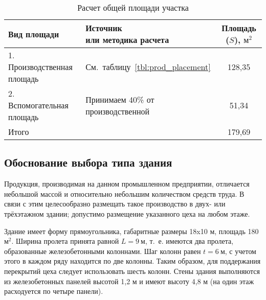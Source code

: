 \begin{table} [h!]
  \caption{
    Расчет общей площади участка
  }\label{tbl:common_placement}
    \begin{tabular}{| m{5.8cm} | m{5.75cm} | c |}
      \hline
      \parbox{5.8cm}{
        \smallskip
        \centering Вид  площади
        \smallskip
      }
      & \parbox{5.75cm}{
          \smallskip
          \centering Источник \\ или методика расчета
          \smallskip
      }
      & Площадь (\( S \)), \( \text{м}^2 \) \\
      \hline

      1. Производственная \newline площадь 
      & \centering См.~таблицу~\ref{tbl:prod_placement}
      & 128{,}35 \\
      \hline

      2. Вспомогательная \newline площадь 
      & \centering Принимаем 40\% \newline от производственной
      & 51{,}34 \\
      \hline
      
      Итого & & 179{,}69 \\
      \hline
    \end{tabular}
\end{table}

\subsection{Обоснование выбора типа здания}

Продукция, производимая на данном промышленном предприятии,
отличается небольшой массой и относительно небольшим количеством средств труда.
В связи с этим целесообразно размещать такое производство в двух- или трёхэтажном
здании; допустимо размещение указанного цеха на любом этаже.

Здание имеет форму прямоугольника, габаритные размеры 18x10 м, 
площадь 180 \( \text{м}^2 \).
Ширина пролета принята равной \( L = 9 \: \text{м} \),
т.~е. имеются два пролета, образованные железобетонными колоннами. 
Шаг колонн равен \( t = 6 \: \text{м} \), с учетом этого в каждом ряду находится
по две колонны.
Таким образом, для поддержания перекрытий цеха следует использовать шесть колонн.
Стены здания выполняются из железобетонных панелей высотой 1,2 м и
имеют высоту 4,8 м (на один этаж расходуется по четыре панели).
